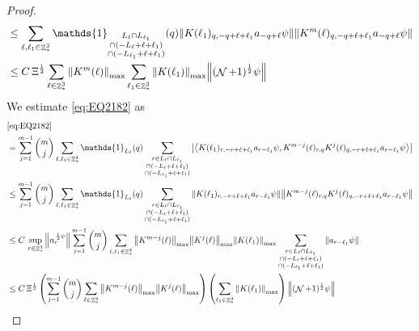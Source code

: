 \documentclass[sn-mathphys, Numbered ,a4paper]{sn-jnl}%
\DeclareMathOperator{\Z}{\mathbb{Z}}
\DeclareMathOperator{\NN}{\mathcal{N}}
\newcommand{\half}{\frac{1}{2}}
\newcommand{\eva}[1]{\left\langle #1 \right\rangle}
\theoremstyle{plain}
\theoremstyle{definition}
\theoremstyle{remark}
\theoremstyle{plain}
\theoremstyle{definition}
\theoremstyle{remark}
\begin{document}
\begin{proof}
\begin{align}
	&\leq \sum\limits_{\ell, \ell_1\in \Z^3_*} \mathds{1}_{\substack{L_{\ell}\cap L_{\ell_1}\\\cap (-L_{\ell}+\ell+\ell_1) \\ \cap (-L_{\ell_1}+\ell+\ell_1)}}(q) \norm{ K(\ell_1)_{q,-q+\ell+\ell_1} a_{-q+\ell} \psi}\norm{ K^m(\ell)_{q,-q+\ell+\ell_1} a_{-q+\ell} \psi }\nonumber\\
	&\leq C\,\Xi^\half \sum\limits_{\ell \in \Z^3_*} \norm{K^m(\ell)}_{\mathrm{max}} \sum\limits_{\ell_1 \in \Z^3_*} \norm{K(\ell_1)}_{\mathrm{max}}   \norm{  (\NN+1)^\half \psi}\label{eq:estEQ2181}
\end{align}
We estimate \eqref{eq:EQ2182} as
\begin{align}
	& \eqref{eq:EQ2182}\nonumber\\
	&= \sum\limits_{j=1}^{m-1} {{m}\choose j} \sum\limits_{\ell, \ell_1\in \Z^3_*}\mathds{1}_{L_{\ell}}(q) \sum\limits_{\substack{r\in L_{\ell} \cap L_{\ell_1}\\\cap (-L_{\ell}+\ell+\ell_1) \\ \cap (-L_{\ell_1}+\ell+\ell_1)}}  \abs{\eva{ K(\ell_1)_{r,-r+\ell+\ell_1} a_{r-\ell_1} \psi, K^{m-j}(\ell)_{r,q} K^j(\ell)_{q,-r+\ell+\ell_1} a_{r-\ell_1} \psi }}\nonumber\\
	&\leq \sum\limits_{j=1}^{m-1} {{m}\choose j} \sum\limits_{\ell, \ell_1\in \Z^3_*}\mathds{1}_{L_{\ell}}(q) \sum\limits_{\substack{r\in L_{\ell} \cap L_{\ell_1}\\\cap (-L_{\ell}+\ell+\ell_1) \\ \cap (-L_{\ell_1}+\ell+\ell_1)}}  \norm{ K(\ell_1)_{r,-r+\ell+\ell_1} a_{r-\ell_1} \psi} \norm{ K^{m-j}(\ell)_{r,q} K^j(\ell)_{q,-r+\ell+\ell_1} a_{r-\ell_1} \psi} \nonumber\\
	&\leq C\, \sup\limits_{r \in \Z^3_*}\norm{n_r^{\,\half\psi}} \sum\limits_{j=1}^{m-1} {{m}\choose j} \sum\limits_{\ell, \ell_1\in \Z^3_*} \norm{K^{m-j}(\ell)}_{\mathrm{max}} \norm{K^j(\ell)}_{\mathrm{max}} \norm{ K(\ell_1)}_{\mathrm{max}} \sum\limits_{\substack{r\in L_{\ell} \cap L_{\ell_1}\\\cap (-L_{\ell}+\ell+\ell_1) \\ \cap (-L_{\ell_1}+\ell+\ell_1)}}  \norm{ a_{r-\ell_1} \psi}\nonumber\\
	&\leq C\,\Xi^\half \left(\sum\limits_{j=1}^{m-1} {{m}\choose j} \sum\limits_{ \ell\in \Z^3_*} \norm{K^{m-j}(\ell)}_{\mathrm{max}} \norm{K^j(\ell)}_{\mathrm{max}}\right) \left(\sum\limits_{ \ell_1\in \Z^3_*}\norm{ K(\ell_1)}_{\mathrm{max}} \right) \norm{ (\NN+1)^\half \psi}\label{eq:estEQ2182}
\end{align}

\end{proof}
\end{document}
